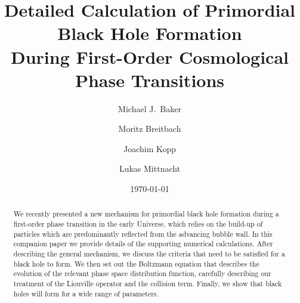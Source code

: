 \documentclass[
onecolumn, %
11pt, %
tightenlines,
superscriptaddress, %
nofootinbib, %
preprintnumbers, %
prd %
]{revtex4-1}
\begin{document}
\title{Detailed Calculation of Primordial Black Hole Formation \\
       During First-Order Cosmological Phase Transitions}

\author{Michael J.\ Baker}

\author{Moritz Breitbach}

\author{Joachim Kopp}

\author{Lukas Mittnacht}

\date{\today}



\begin{abstract}
    \noindent
    We recently presented a new mechanism for primordial black hole formation during a first-order phase transition in the early Universe, which relies on the build-up of particles which are predominantly reflected from the advancing bubble wall.  In this companion paper we provide details of the supporting numerical calculations.  After describing the general mechanism, we discuss the criteria that need to be satisfied for a black hole to form.  We then set out the Boltzmann equation that describes the evolution of the relevant phase space distribution function, carefully describing our treatment of the Liouville operator and the collision term.  Finally, we show that black holes will form for a wide range of parameters.
\end{abstract}
\end{document}
